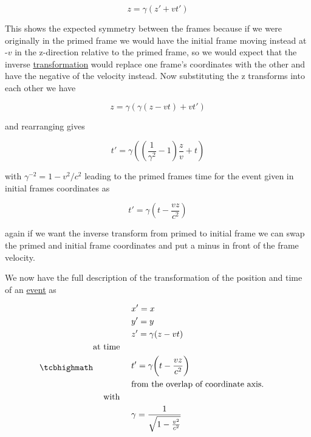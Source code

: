 \begin{equation}
	{z} = {\gamma} ({z{'}} + {v}{t{'}})
\end{equation}

This shows the expected symmetry between the frames because if we were originally in the primed frame we would have the initial frame moving instead at -${v}$ in the z-direction relative to the primed frame, so we would expect that the inverse \hyperlink{def-transform}{transformation} would replace one frame's coordinates with the other and have the negative of the velocity instead.
Now substituting the z transforms into each other we have

\begin{equation}
	{z} = {\gamma} ( {\gamma} ({z}-{v}{t}) + {v}{t{'}})
\end{equation}

and rearranging gives

\begin{equation}
	{t{'}} = {\gamma} \left( \left( \dfrac{1}{{\gamma}^2}-1 \right)\frac{z}{v} + t \right)
\end{equation}

with ${\gamma}^{-2} = 1-{v}^2/{c}^2$ leading to the primed frames time for the event given in initial frames coordinates as

\begin{equation}
	{t{'}} = {\gamma} \left( t-\dfrac{{v}{z}}{{c}^2} \right)
\end{equation}

again if we want the inverse transform from primed to initial frame we can swap the primed and initial frame coordinates and put a minus in front of the frame velocity.

We now have the full description of the transformation of the position and time of an \hyperlink{def-event}{event} as

\begin{equation}
	\mhl{
		\begin{aligned}
			 & {x{'}} = x                                           \\
			 & {y{'}} = y                                           \\
			 & {z{'}} = {\gamma} ({z}-{v}{t})                       \\
			\text{at time \ \ \ }                                   \\
			 & {t{'}} = {\gamma} \bigg(t-\frac{{v}{z}}{{c}^2}\bigg) \\
			 & \text{from the overlap of coordinate axis. \ \ \ }   \\
			\text{with \ \ \ }                                      \\
			 & {\gamma} = \dfrac{1}{\sqrt{1-\frac{{v}^2}{{c}^2}}}
		\end{aligned}
	}
	\label{eq: Lorentz transformation}
\end{equation}

